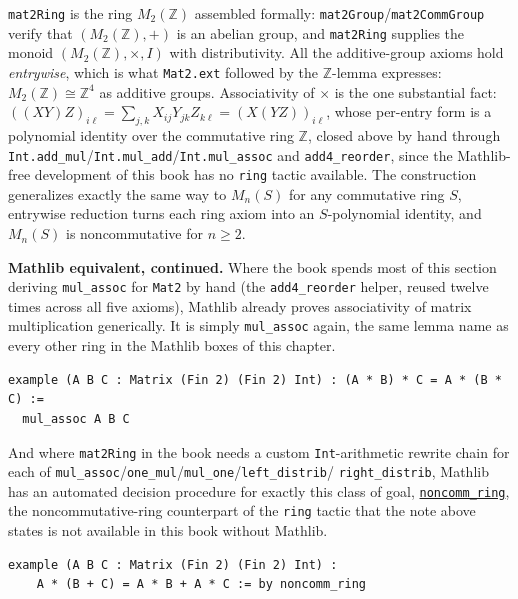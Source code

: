 \begin{mathreading}

\texttt{mat2Ring} is the ring \(M_2(\mathbb{Z})\) assembled formally: \texttt{mat2Group}/\texttt{mat2CommGroup} verify that \((M_2(\mathbb{Z}), +)\) is an abelian group, and \texttt{mat2Ring} supplies the monoid \((M_2(\mathbb{Z}),
\times, I)\) with distributivity. All the additive-group axioms hold \emph{entrywise}, which is what \texttt{Mat2.ext} followed by the \(\mathbb{Z}\)-lemma expresses: \(M_2(\mathbb{Z}) \cong \mathbb{Z}^4\) as additive groups. Associativity of \(\times\) is the one substantial fact: \(((XY)Z)_{i\ell} = \sum_{j,k} X_{ij}Y_{jk}Z_{k\ell}
= (X(YZ))_{i\ell}\), whose per-entry form is a polynomial identity over the commutative ring \(\mathbb{Z}\), closed above by hand through \texttt{Int.add\_\allowbreak{}mul}/\texttt{Int.mul\_\allowbreak{}add}/\texttt{Int.mul\_\allowbreak{}assoc} and \texttt{add4\_\allowbreak{}reorder}, since the Mathlib-free development of this book has no \texttt{ring} tactic available. The construction generalizes exactly the same way to \(M_n(S)\) for any commutative ring \(S\), entrywise reduction turns each ring axiom into an \(S\)-polynomial identity, and \(M_n(S)\) is noncommutative for \(n \ge 2\).

\end{mathreading}

\textbf{Mathlib equivalent, continued.} Where the book spends most of this section deriving \texttt{mul\_\allowbreak{}assoc} for \texttt{Mat2} by hand (the \texttt{add4\_\allowbreak{}reorder} helper, reused twelve times across all five axioms), Mathlib already proves associativity of matrix multiplication generically. It is simply \texttt{mul\_\allowbreak{}assoc} again, the same lemma name as every other ring in the Mathlib boxes of this chapter.

\begin{lstlisting}
example (A B C : Matrix (Fin 2) (Fin 2) Int) : (A * B) * C = A * (B * C) :=
  mul_assoc A B C
\end{lstlisting}

And where \texttt{mat2Ring} in the book needs a custom \texttt{Int}-arithmetic rewrite chain for each of \texttt{mul\_\allowbreak{}assoc}/\texttt{one\_\allowbreak{}mul}/\texttt{mul\_\allowbreak{}one}/\texttt{left\_\allowbreak{}distrib}/ \texttt{right\_\allowbreak{}distrib}, Mathlib has an automated decision procedure for exactly this class of goal, \href{https://lean-lang.org/doc/reference/latest/Tactic-Proofs/Tactic-Reference/}{\texttt{noncomm\_\allowbreak{}ring}}, the noncommutative-ring counterpart of the \texttt{ring} tactic that the note above states is not available in this book without Mathlib.

\begin{lstlisting}
example (A B C : Matrix (Fin 2) (Fin 2) Int) :
    A * (B + C) = A * B + A * C := by noncomm_ring
\end{lstlisting}
